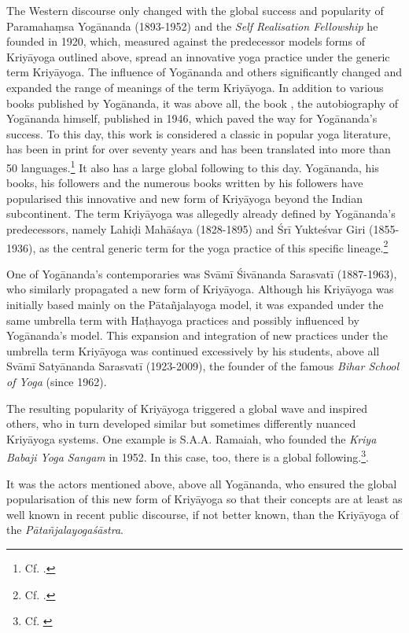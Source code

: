 The Western discourse only changed with the global success and popularity of Paramahaṃsa Yogānanda (1893-1952) and the \textit{Self Realisation Fellowship} he founded in 1920, which, measured against the predecessor models forms of Kriyāyoga outlined above, spread an innovative yoga practice under the generic term Kriyāyoga. The influence of Yogānanda and others significantly changed and expanded the range of meanings of the term Kriyāyoga. In addition to various books published by Yogānanda, it was above all, the book , the autobiography of Yogānanda himself, published in 1946, which paved the way for Yogānanda's success. To this day, this work is considered a classic in popular yoga literature, has been in print for over seventy years and has been translated into more than 50 languages.\footnote{Cf. \cite{yoganandawebsite}.} It also has a large global following to this day. Yogānanda, his books, his followers and the numerous books written by his followers have popularised this innovative and new form of Kriyāyoga beyond the Indian subcontinent. The term Kriyāyoga was allegedly already defined by Yogānanda's predecessors, namely Lahiḍi Mahāśaya (1828-1895) and Śrī Yukteśvar Giri (1855-1936), as the central generic term for the yoga practice of this specific lineage.\footnote{Cf. \citeauthor[2010: 51-52]{govindan2010}.} 

One of Yogānanda's contemporaries was Svāmī Śivānanda Sarasvatī (1887-1963), who similarly propagated a new form of Kriyāyoga. Although his Kriyāyoga was initially based mainly on the Pātañjalayoga model, it was expanded under the same umbrella term with Haṭhayoga practices and possibly influenced by Yogānanda's model. This expansion and integration of new practices under the umbrella term Kriyāyoga was continued excessively by his students, above all Svāmī Satyānanda Sarasvatī (1923-2009), the founder of the famous \textit{Bihar School of Yoga} (since 1962).

The resulting popularity of Kriyāyoga triggered a global wave and inspired others, who in turn developed similar but sometimes differently nuanced Kriyāyoga systems. One example is S.A.A. Ramaiah, who founded the \textit{Kriya Babaji Yoga Sangam} in 1952. In this case, too, there is a global following.\footnote{Cf. \cite{kriyababajiyoga}}.

It was the actors mentioned above, above all Yogānanda, who ensured the global popularisation of this new form of Kriyāyoga so that their concepts are at least as well known in recent public discourse, if not better known, than the Kriyāyoga of the \textit{Pātañjalayogaśāstra}.

